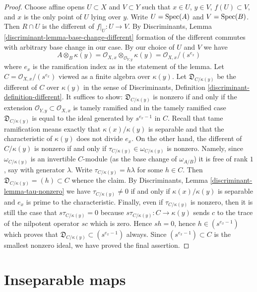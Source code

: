 \begin{proof}
\medskip\noindent
Choose affine opens $U \subset X$ and $V \subset Y$
such that $x \in U$, $y \in V$, $f(U) \subset V$, and $x$ is the only
point of $U$ lying over $y$. Write $U = \mathop{\mathrm{Spec}}(A)$ and $V = \mathop{\mathrm{Spec}}(B)$.
Then $R \cap U$ is the different of $f|_U : U \to V$.
By Discriminants, Lemma \ref{discriminant-lemma-base-change-different}
formation of the different commutes with arbitrary base change
in our case. By our choice of $U$ and $V$ we have
$$
A \otimes_B \kappa(y) =
\mathcal{O}_{X, x} \otimes_{\mathcal{O}_{Y, y}} \kappa(y) =
\mathcal{O}_{X, x}/(s^{e_x})
$$
where $e_x$ is the ramification index as in the statement of the lemma.
Let $C = \mathcal{O}_{X, x}/(s^{e_x})$ viewed as a finite algebra
over $\kappa(y)$. Let $\mathfrak{D}_{C/\kappa(y)}$ be the different
of $C$ over $\kappa(y)$ in the sense of
Discriminants, Definition \ref{discriminant-definition-different}.
It suffices to show: $\mathfrak{D}_{C/\kappa(y)}$
is nonzero if and only if the extension
$\mathcal{O}_{Y, y} \subset \mathcal{O}_{X, x}$ is tamely ramified
and in the tamely ramified case $\mathfrak{D}_{C/\kappa(y)}$
is equal to the ideal generated by $s^{e_x - 1}$ in $C$.
Recall that tame ramification means exactly that $\kappa(x)/\kappa(y)$
is separable and that the characteristic of $\kappa(y)$ does not
divide $e_x$. On the other hand, the different of $C/\kappa(y)$ is nonzero
if and only if $\tau_{C/\kappa(y)} \in \omega_{C/\kappa(y)}$ is nonzero.
Namely, since $\omega_{C/\kappa(y)}$ is an invertible $C$-module
(as the base change of $\omega_{A/B}$)
it is free of rank $1$, say with generator $\lambda$. Write
$\tau_{C/\kappa(y)} = h\lambda$ for some $h \in C$. Then
$\mathfrak{D}_{C/\kappa(y)} = (h) \subset C$ whence the claim.
By Discriminants, Lemma \ref{discriminant-lemma-tau-nonzero}
we have $\tau_{C/\kappa(y)} \not = 0$
if and only if $\kappa(x)/\kappa(y)$
is separable and $e_x$ is prime to the characteristic.
Finally, even if $\tau_{C/\kappa(y)}$ is nonzero, then
it is still the case that $s \tau_{C/\kappa(y)} = 0$
because $s\tau_{C/\kappa(y)} : C \to \kappa(y)$
sends $c$ to the trace of the nilpotent operator $sc$ which is zero.
Hence $sh = 0$, hence $h \in (s^{e_x - 1})$ which proves
that $\mathfrak{D}_{C/\kappa(y)} \subset (s^{e_x - 1})$ always.
Since $(s^{e_x - 1}) \subset C$ is the smallest nonzero ideal,
we have proved the final assertion.
\end{proof}






\section{Inseparable maps}
\label{section-inseparable}

